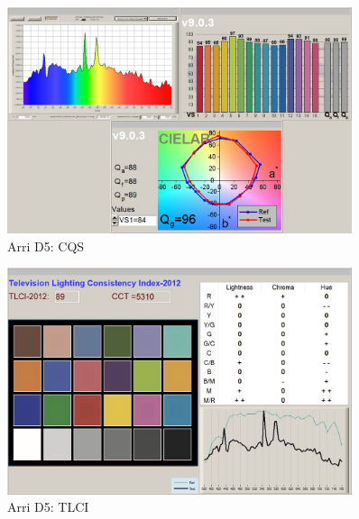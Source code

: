 \begin{figure}[htp]     %
\centering
\includegraphics[width=0.9\textwidth]{vormessung/arriD5vorcqs} 
\caption {Arri D5: CQS} 
\end{figure}

\begin{figure}[htp]     %
\centering
\includegraphics[width=0.9\textwidth]{vormessung/arriD5vortlci} 
\caption {Arri D5: TLCI} 
\end{figure}

